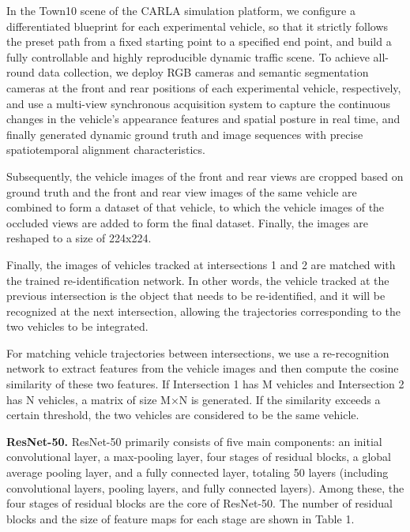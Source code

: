 \documentclass[lettersize,journal]{IEEEtran}
\begin{document}
In the Town10 scene of the CARLA simulation platform, we configure a differentiated blueprint for each experimental vehicle, so that it strictly follows the preset path from a fixed starting point to a specified end point, and build a fully controllable and highly reproducible dynamic traffic scene.
To achieve all-round data collection, we deploy RGB cameras and semantic segmentation cameras at the front and rear positions of each experimental vehicle, respectively, and use a multi-view synchronous acquisition system to capture the continuous changes in the vehicle's appearance features and spatial posture in real time, and finally generated dynamic ground truth and image sequences with precise spatiotemporal alignment characteristics.

Subsequently, the vehicle images of the front and rear views are cropped based on ground truth and the front and rear view images of the same vehicle are combined to form a dataset of that vehicle, to which the vehicle images of the occluded views are added to form the final dataset.
Finally, the images are reshaped to a size of 224x224.

Finally, the images of vehicles tracked at intersections 1 and 2 are matched with the trained re-identification network.
In other words, the vehicle tracked at the previous intersection is the object that needs to be re-identified, and it will be recognized at the next intersection, allowing the trajectories corresponding to the two vehicles to be integrated.

For matching vehicle trajectories between intersections, we use a re-recognition network to extract features from the vehicle images and then compute the cosine similarity of these two features.
If Intersection 1 has M vehicles and Intersection 2 has N vehicles, a matrix of size M×N is generated. 
If the similarity exceeds a certain threshold, the two vehicles are considered to be the same vehicle.

\textbf{ResNet-50.}
ResNet-50 primarily consists of five main components: an initial convolutional layer, a max-pooling layer, four stages of residual blocks, a global average pooling layer, and a fully connected layer, totaling 50 layers (including convolutional layers, pooling layers, and fully connected layers). 
Among these, the four stages of residual blocks are the core of ResNet-50. 
The number of residual blocks and the size of feature maps for each stage are shown in Table 1.
\end{document}
